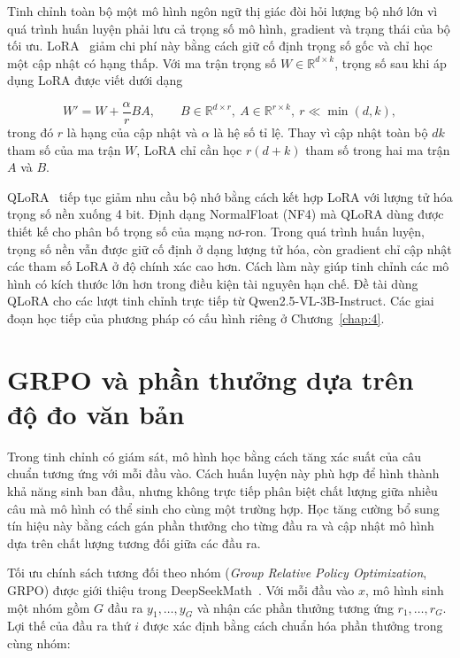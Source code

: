 Tinh chỉnh toàn bộ một mô hình ngôn ngữ thị giác đòi hỏi lượng bộ nhớ lớn vì quá trình huấn luyện phải lưu cả trọng số mô hình, gradient và trạng thái của bộ tối ưu. LoRA~\cite{lora} giảm chi phí này bằng cách giữ cố định trọng số gốc và chỉ học một cập nhật có hạng thấp. Với ma trận trọng số $W \in \mathbb{R}^{d \times k}$, trọng số sau khi áp dụng LoRA được viết dưới dạng

\begin{equation}
W' = W + \frac{\alpha}{r}BA, \qquad B \in \mathbb{R}^{d \times r},\ A \in \mathbb{R}^{r \times k},\ r \ll \min(d,k),
\label{eq:2.1}
\end{equation}
\noindent
trong đó $r$ là hạng của cập nhật và $\alpha$ là hệ số tỉ lệ. Thay vì cập nhật toàn bộ $dk$ tham số của ma trận $W$, LoRA chỉ cần học $r(d+k)$ tham số trong hai ma trận $A$ và $B$.

QLoRA~\cite{qlora} tiếp tục giảm nhu cầu bộ nhớ bằng cách kết hợp LoRA với lượng tử hóa trọng số nền xuống 4 bit. Định dạng NormalFloat (NF4) mà QLoRA dùng được thiết kế cho phân bố trọng số của mạng nơ-ron. Trong quá trình huấn luyện, trọng số nền vẫn được giữ cố định ở dạng lượng tử hóa, còn gradient chỉ cập nhật các tham số LoRA ở độ chính xác cao hơn. Cách làm này giúp tinh chỉnh các mô hình có kích thước lớn hơn trong điều kiện tài nguyên hạn chế. Đề tài dùng QLoRA cho các lượt tinh chỉnh trực tiếp từ Qwen2.5-VL-3B-Instruct. Các giai đoạn học tiếp của phương pháp có cấu hình riêng ở Chương~\ref{chap:4}.

\section{GRPO và phần thưởng dựa trên độ đo văn bản}\label{sec:2.3}

Trong tinh chỉnh có giám sát, mô hình học bằng cách tăng xác suất của câu chuẩn tương ứng với mỗi đầu vào. Cách huấn luyện này phù hợp để hình thành khả năng sinh ban đầu, nhưng không trực tiếp phân biệt chất lượng giữa nhiều câu mà mô hình có thể sinh cho cùng một trường hợp. Học tăng cường bổ sung tín hiệu này bằng cách gán phần thưởng cho từng đầu ra và cập nhật mô hình dựa trên chất lượng tương đối giữa các đầu ra.

Tối ưu chính sách tương đối theo nhóm (\emph{Group Relative Policy Optimization}, GRPO) được giới thiệu trong DeepSeekMath~\cite{shao2024grpo}. Với mỗi đầu vào $x$, mô hình sinh một nhóm gồm $G$ đầu ra $y_1, \ldots, y_G$ và nhận các phần thưởng tương ứng $r_1, \ldots, r_G$. Lợi thế của đầu ra thứ $i$ được xác định bằng cách chuẩn hóa phần thưởng trong cùng nhóm:

